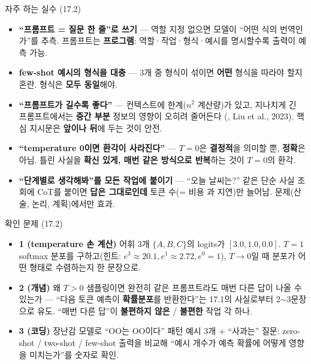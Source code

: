 \documentclass[aspectratio=169,11pt]{beamer}
\begin{document}
\begin{frame}{자주 하는 실수 (17.2)}
  \begin{itemize}
    \item \textbf{``프롬프트 = 질문 한 줄''로 쓰기} --- 역할
      지정 없으면 모델이 ``어떤 식의 번역인가''를 추측.
      프롬프트는 \textbf{프로그램}: 역할·작업·형식·예시를
      명시할수록 출력이 예측 가능.
    \item \textbf{few-shot 예시의 형식을 대충} --- 3개 중
      형식이 섞이면 \textbf{어떤} 형식을 따라야 할지 혼란.
      형식은 \textbf{모두 동일}해야.
    \item \textbf{``프롬프트가 길수록 좋다''} --- 컨텍스트에
      한계($n^2$ 계산량)가 있고, 지나치게 긴 프롬프트에서는
      \textbf{중간 부분} 정보의 영향이 오히려 줄어든다
      (, Liu et al., 2023). 핵심
      지시문은 \textbf{앞이나 뒤}에 두는 것이 안전.
    \item \textbf{``temperature 0이면 환각이 사라진다''} ---
      $T=0$은 \textbf{결정적}을 의미할 뿐, \textbf{정확}은
      아님. 틀린 사실을 \textbf{확신 있게, 매번 같은
      방식으로 반복}하는 것이 $T=0$의 환각.
    \item \textbf{``단계별로 생각해봐''를 모든 작업에
      붙이기} --- ``오늘 날씨는?'' 같은 단순 사실 조회에
      CoT를 붙이면 \textbf{답은 그대로인데} 토큰 수(= 비용
     과 지연)만 늘어남.  문제(산술, 논리,
      계획)에서만 효과.
  \end{itemize}
\end{frame}

\begin{frame}{확인 문제 (17.2)}
  \begin{itemize}
    \item \textbf{1 (temperature 손 계산)} 어휘 3개
      $\{A,B,C\}$의 logits가 $[3.0, 1.0, 0.0]$. $T=1$
      softmax 분포를 구하고(힌트: $e^3 \approx 20.1, e^1
      \approx 2.72, e^0 = 1$), $T \to 0$일 때 분포가 어떤
      형태로 수렴하는지 한 문장으로.
    \item \textbf{2 (개념)} 왜 $T > 0$ 샘플링이면 완전히
      같은 프롬프트라도 매번 다른 답이 나올 수 있는가 —
      ``다음 토큰 예측이 \textbf{확률분포}를 반환한다''는
      17.1의 사실로부터 2$\sim$3문장으로 유도. ``매번 다른
      답''이 \textbf{불편하지 않은} / \textbf{불편한} 작업
      각 하나.
    \item \textbf{3 (코딩)} 장난감 모델로 ``OO는 OO이다''
      패턴 예시 3개 + ``사과는'' 질문: zero-shot / two-shot /
      few-shot 출력을 비교해 ``예시 개수가 예측 확률에
      어떻게 영향을 미치는가''를 숫자로 확인.
  \end{itemize}
\end{frame}
\end{document}
